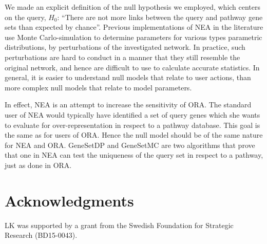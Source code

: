 \documentclass[10pt,letterpaper]{article}
\begin{document}
We made an explicit definition of the null hypothesis we employed, which centers on the query, $H_0$: ``There are not more links between the query and pathway gene sets than expected by chance''. Previous implementations of NEA in the literature use Monte Carlo-simulation to determine parameters for various types parametric distributions, by perturbations of the investigated network. In practice, such perturbations are hard to conduct in a manner that they still resemble the original network, and hence are difficult to use to calculate accurate statistics. In general, it is easier to understand null models that relate to user actions, than more complex null models that relate to model parameters.

In effect, NEA is an attempt to increase the sensitivity of ORA. The standard user of NEA would typically have identified a set of query genes which she wants to evaluate for over-representation in respect to a pathway database. This goal is the same as for users of ORA. Hence the null model should be of the same nature for NEA and ORA. GeneSetDP and GeneSetMC are two algorithms that prove that one in NEA can test the uniqueness of the query set in respect to a pathway, just as done in ORA.

\section*{Acknowledgments}

LK was supported by a grant from the Swedish Foundation for Strategic Research (BD15-0043).


\end{document}
